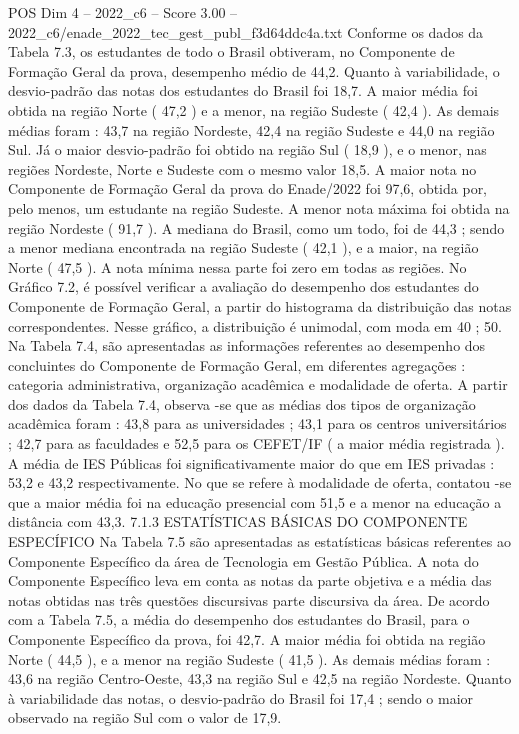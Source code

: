 \begin{textsample}{POS Dim 4 – 2022\_c6 – Score 3.00 – 2022\_c6/enade\_2022\_tec\_gest\_publ\_f3d64ddc4a.txt}
Conforme os dados da Tabela 7.3, os estudantes de todo o Brasil obtiveram, no Componente de Formação Geral da prova, desempenho médio de 44,2.
Quanto à variabilidade, o desvio-padrão das notas dos estudantes do Brasil foi 18,7.
A maior média foi obtida na região Norte ( 47,2 ) e a menor, na região Sudeste ( 42,4 ).
As demais médias foram : 43,7 na região Nordeste, 42,4 na região Sudeste e 44,0 na região Sul.
Já o maior desvio-padrão foi obtido na região Sul ( 18,9 ), e o menor, nas regiões Nordeste, Norte e Sudeste com o mesmo valor 18,5.
A maior nota no Componente de Formação Geral da prova do Enade/2022 foi 97,6, obtida por, pelo menos, um estudante na região Sudeste.
A menor nota máxima foi obtida na região Nordeste ( 91,7 ).
A mediana do Brasil, como um todo, foi de 44,3 ; sendo a menor mediana encontrada na região Sudeste ( 42,1 ), e a maior, na região Norte ( 47,5 ).
A nota mínima nessa parte foi zero em todas as regiões.
No Gráfico 7.2, é possível verificar a avaliação do desempenho dos estudantes do Componente de Formação Geral, a partir do histograma da distribuição das notas correspondentes.
Nesse gráfico, a distribuição é unimodal, com moda em 40 ; 50.
Na Tabela 7.4, são apresentadas as informações referentes ao desempenho dos concluintes do Componente de Formação Geral, em diferentes agregações : categoria administrativa, organização acadêmica e modalidade de oferta.
A partir dos dados da Tabela 7.4, observa -se que as médias dos tipos de organização acadêmica foram : 43,8 para as universidades ; 43,1 para os centros universitários ; 42,7 para as faculdades e 52,5 para os CEFET/IF ( a maior média registrada ).
A média de IES Públicas foi significativamente maior do que em IES privadas : 53,2 e 43,2 respectivamente.
No que se refere à modalidade de oferta, contatou -se que a maior média foi na educação presencial com 51,5 e a menor na educação a distância com 43,3. 7.1.3 ESTATÍSTICAS BÁSICAS DO COMPONENTE ESPECÍFICO Na Tabela 7.5 são apresentadas as estatísticas básicas referentes ao Componente Específico da área de Tecnologia em Gestão Pública.
A nota do Componente Específico leva em conta as notas da parte objetiva e a média das notas obtidas nas três questões discursivas parte discursiva da área.
De acordo com a Tabela 7.5, a média do desempenho dos estudantes do Brasil, para o Componente Específico da prova, foi 42,7.
A maior média foi obtida na região Norte ( 44,5 ), e a menor na região Sudeste ( 41,5 ).
As demais médias foram : 43,6 na região Centro-Oeste, 43,3 na região Sul e 42,5 na região Nordeste.
Quanto à variabilidade das notas, o desvio-padrão do Brasil foi 17,4 ; sendo o maior observado na região Sul com o valor de 17,9.

\end{textsample}
